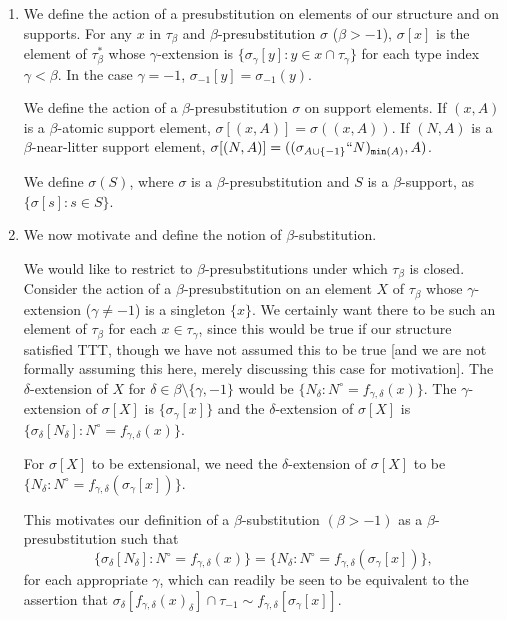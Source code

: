\documentclass[12pt]{article}
\begin{document}
\begin{enumerate}
\item  We define the action of a presubstitution on elements of our structure and on supports.  For any $x$ in $\tau_\beta$ and $\beta$-presubstitution $\sigma$ ($\beta>-1$), $\sigma[x]$ is the element of $\tau^*_\beta$ whose $\gamma$-extension is $\{\sigma_\gamma[y]:y \in x \cap \tau_\gamma\}$ for each type index $\gamma<\beta$.  In
the case $\gamma=-1$, $\sigma_{-1}[y] = \sigma_{-1}(y)$.

We define the action of a $\beta$-presubstitution $\sigma$ on support elements.  If $(x,A)$ is a $\beta$-atomic support element, $\sigma[(x,A)] = \sigma((x,A))$.  If $(N,A)$ is a $\beta$-near-litter support element, $\sigma[(N,A)] = ((\sigma_{A \cup \{-1\}}``N)_{{\tt min}(A)},A)$.

We define $\sigma(S)$, where $\sigma$ is a $\beta$-presubstitution and $S$ is a $\beta$-support, as $\{\sigma[s]:s \in S\}$.

\item  We now motivate and define the notion of $\beta$-substitution.

We would like to restrict to $\beta$-presubstitutions under which $\tau_\beta$ is closed.  Consider the action of a $\beta$-presubstitution on an element $X$ of $\tau_\beta$ whose $\gamma$-extension ($\gamma \neq -1$) is a singleton $\{x\}$.  We certainly want there to be such an element of $\tau_\beta$
for each $x \in \tau_\gamma$, since this would be true if our structure satisfied TTT, though we have not assumed this to be true [and we are not formally assuming this here, merely discussing this case for motivation].  The $\delta$-extension of $X$ for $\delta \in \beta \setminus \{\gamma,-1\}$ would be $\{N_\delta:N^\circ = f_{\gamma,\delta}(x)\}$.
The $\gamma$-extension of $\sigma[X]$ is $\{\sigma_\gamma[x]\}$ and the $\delta$-extension of $\sigma[X]$ is $\{\sigma_\delta[N_\delta]:N^\circ = f_{\gamma,\delta}(x)\}$.  

For $\sigma[X]$ to be extensional, we need the $\delta$-extension of $\sigma[X]$ to be $\{N_\delta:N^\circ = f_{\gamma,\delta}(\sigma_\gamma[x])\}$.

This motivates our definition of a $\beta$-substitution $(\beta>-1)$ as a $\beta$-presubstitution such that $$\{\sigma_\delta[N_\delta]:N^\circ = f_{\gamma,\delta}(x)\} = \{N_\delta:N^\circ = f_{\gamma,\delta}(\sigma_\gamma[x])\},$$ for each appropriate $\gamma$, which can readily be seen to be equivalent to the assertion that
$\sigma_\delta[f_{\gamma,\delta}(x)_\delta] \cap \tau_{-1} \sim  f_{\gamma,\delta}[\sigma_\gamma[x]]$.


\end{enumerate}
\end{document}
